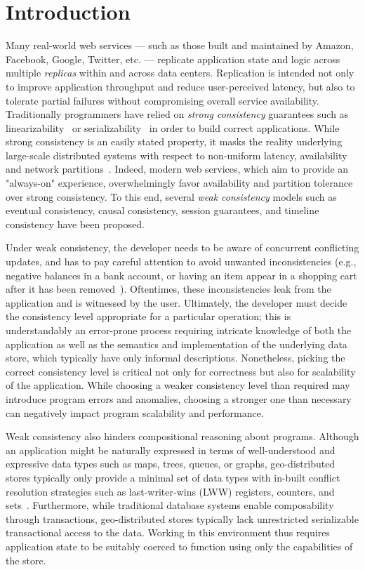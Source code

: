 \section{Introduction}

Many real-world web services --- such as those built and maintained by Amazon,
Facebook, Google, Twitter, etc. --- replicate application state and logic
across multiple \emph{replicas} within and across data centers. Replication is
intended not only to improve application throughput and reduce user-perceived
latency, but also to tolerate partial failures without compromising overall
service availability. Traditionally programmers have relied on \emph{strong
consistency} guarantees such as linearizability~\cite{Herlihy1990} or
serializability~\cite{Serializability} in order to build correct applications.
While strong consistency is an easily stated property, it masks the reality
underlying large-scale distributed systems with respect to non-uniform latency,
availability and network partitions~\cite{Brewer2000,Gilbert2002}. Indeed,
modern web services, which aim to provide an "always-on" experience,
overwhelmingly favor availability and partition tolerance over strong
consistency. To this end, several \emph{weak consistency} models such as
eventual consistency, causal consistency, session guarantees, and timeline
consistency have been proposed.

Under weak consistency, the developer needs to be aware of concurrent
conflicting updates, and has to pay careful attention to avoid unwanted
inconsistencies (e.g., negative balances in a bank account, or having an item
appear in a shopping cart after it has been removed~\cite{Dynamo}). Oftentimes,
these inconsistencies leak from the application and is witnessed by the user.
Ultimately, the developer must decide the consistency level appropriate for a
particular operation; this is understandably an error-prone process requiring
intricate knowledge of both the application as well as the semantics and
implementation of the underlying data store, which typically have only informal
descriptions. Nonetheless, picking the correct consistency level is critical
not only for correctness but also for scalability of the application. While
choosing a weaker consistency level than required may introduce program errors
and anomalies, choosing a stronger one than necessary can negatively impact
program scalability and performance.

Weak consistency also hinders compositional reasoning about programs.  Although an
application might be naturally expressed in terms of well-understood and
expressive data types such as maps, trees, queues, or graphs, geo-distributed
stores typically only provide a minimal set of data types with in-built
conflict resolution strategies such as last-writer-wins (LWW) registers,
counters, and sets~\cite{Cassandra,DynamoDB}.  Furthermore, while traditional
database systems enable composability through transactions, geo-distributed
stores typically lack unrestricted serializable transactional access to the
data. Working in this environment thus requires application state to be
suitably coerced to function using only the capabilities of the store.

